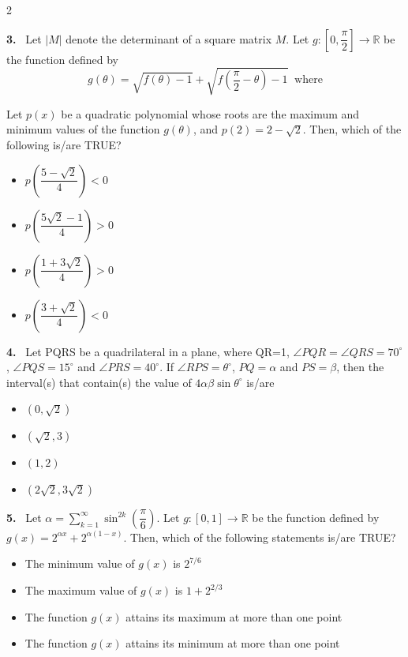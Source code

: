 \documentclass[10pt]{extarticle}
\newcommand{\qn}[1]{\par\smallskip\noindent\textbf{#1.}~}
\newenvironment{qoptions}{\begin{itemize}[leftmargin=1.8em,itemsep=1pt,topsep=2pt,label={}]}{\end{itemize}}
\newcommand{\opt}[2]{\item[(#1)] #2}
\begin{document}
\begin{multicols}{2}
\qn{3} Let $|M|$ denote the determinant of a square matrix $M$. Let $g:\left[0,\dfrac{\pi}{2}\right]\to\mathbb{R}$ be the function defined by
$$g(\theta) = \sqrt{f(\theta)-1} + \sqrt{f\left(\dfrac{\pi}{2}-\theta\right)-1}\ \text{ where}$$
\par\noindent{}\par
Let $p(x)$ be a quadratic polynomial whose roots are the maximum and minimum values of the function $g(\theta)$, and $p(2) = 2-\sqrt2$. Then, which of the following is/are TRUE?
\begin{qoptions}
\opt{A}{$p\left(\dfrac{5-\sqrt2}{4}\right)<0$}
\opt{B}{$p\left(\dfrac{5\sqrt2-1}{4}\right)>0$}
\opt{C}{$p\left(\dfrac{1+3\sqrt2}{4}\right)>0$}
\opt{D}{$p\left(\dfrac{3+\sqrt2}{4}\right)<0$}
\end{qoptions}

\qn{4} Let PQRS be a quadrilateral in a plane, where QR=1, $\angle PQR = \angle QRS = 70^\circ$, $\angle PQS = 15^\circ$ and $\angle PRS = 40^\circ$. If $\angle RPS = \theta^\circ$, $PQ = \alpha$ and $PS = \beta$, then the interval(s) that contain(s) the value of $4\alpha\beta\sin\theta^\circ$ is/are
\begin{qoptions}
\opt{A}{$(0,\sqrt2)$}
\opt{B}{$(\sqrt2,3)$}
\opt{C}{$(1,2)$}
\opt{D}{$(2\sqrt2,3\sqrt2)$}
\end{qoptions}

\qn{5} Let $\alpha = \displaystyle\sum_{k=1}^{\infty}\sin^{2k}\left(\dfrac{\pi}{6}\right)$. Let $g:[0,1]\to\mathbb{R}$ be the function defined by $g(x) = 2^{\alpha x} + 2^{\alpha(1-x)}$. Then, which of the following statements is/are TRUE?
\begin{qoptions}
\opt{A}{The minimum value of $g(x)$ is $2^{7/6}$}
\opt{B}{The maximum value of $g(x)$ is $1+2^{2/3}$}
\opt{C}{The function $g(x)$ attains its maximum at more than one point}
\opt{D}{The function $g(x)$ attains its minimum at more than one point}
\end{qoptions}


\end{multicols}
\end{document}
